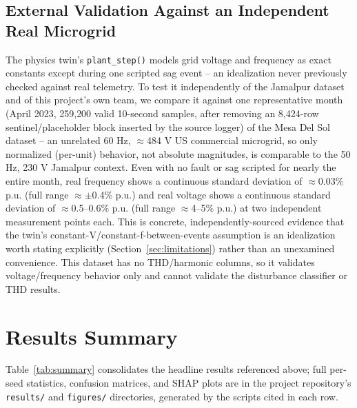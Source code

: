 \documentclass[conference]{IEEEtran}
\begin{document}
\subsection{External Validation Against an Independent Real Microgrid}
\label{sec:external-validation}
The physics twin's \texttt{plant\_step()} models grid voltage and
frequency as exact constants except during one scripted sag event --
an idealization never previously checked against real telemetry. To
test it independently of the Jamalpur dataset and of this project's
own team, we compare it against one representative month (April 2023,
259{,}200 valid 10-second samples, after removing an 8{,}424-row
sentinel/placeholder block inserted by the source logger) of the Mesa
Del Sol dataset \cite{bashir2023mesadelsol} -- an unrelated 60 Hz,
$\approx$484 V US commercial microgrid, so only normalized (per-unit)
behavior, not absolute magnitudes, is comparable to the 50 Hz, 230 V
Jamalpur context. Even with no fault or sag scripted for nearly the
entire month, real frequency shows a continuous standard deviation of
$\approx$0.03\% p.u. (full range $\approx\pm$0.4\% p.u.) and real
voltage shows a continuous standard deviation of $\approx$0.5--0.6\%
p.u. (full range $\approx$4--5\% p.u.) at two independent measurement
points each. This is concrete, independently-sourced evidence that
the twin's constant-V/constant-f-between-events assumption is an
idealization worth stating explicitly (Section~\ref{sec:limitations})
rather than an unexamined convenience. This dataset has no
THD/harmonic columns, so it validates voltage/frequency behavior only
and cannot validate the disturbance classifier or THD results.

\section{Results Summary}
Table~\ref{tab:summary} consolidates the headline results referenced
above; full per-seed statistics, confusion matrices, and SHAP plots
are in the project repository's \texttt{results/} and
\texttt{figures/} directories, generated by the scripts cited in each
row.
\end{document}
